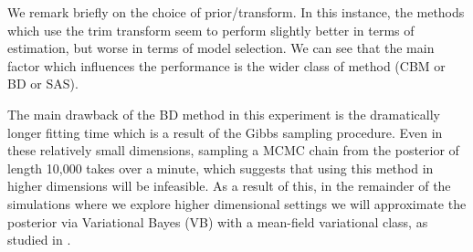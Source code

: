 \documentclass[11pt]{article}
\begin{document}
We remark briefly on the choice of prior/transform. In this instance, the methods which use the trim transform seem to perform slightly better in terms of estimation, but worse in terms of model selection. We can see that the main factor which influences the performance is the wider class of method (CBM or BD or SAS).
 
 The main drawback of the BD method in this experiment is the dramatically longer fitting time which is a result of the Gibbs sampling procedure. Even in these relatively small dimensions, sampling a MCMC chain from the posterior of length 10,000 takes over a minute, which suggests that using this method in higher dimensions will be infeasible. As a result of this, in the remainder of the simulations where we explore higher dimensional settings we will approximate the posterior via Variational Bayes (VB) with a mean-field variational class, as studied in \cite{Ray_Szabo_2020}.
   
\end{document}
